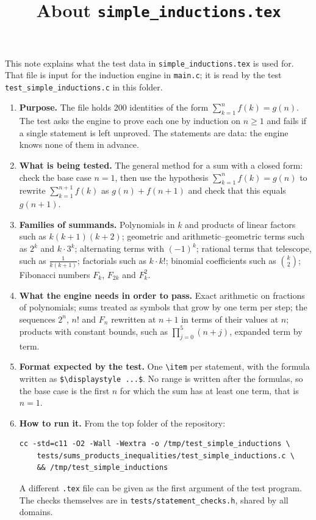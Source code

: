 \documentclass[11pt,a4paper]{article}
\title{About \texttt{simple\_inductions.tex}}
\author{}
\date{}
\begin{document}
\maketitle
This note explains what the test data in \texttt{simple\_inductions.tex} is used for. That file is input for the induction engine in \texttt{main.c}; it is read by the test \texttt{test\_simple\_inductions.c} in this folder.

\begin{enumerate}
\item \textbf{Purpose.} The file holds 200 identities of the form $\displaystyle \sum_{k=1}^{n} f(k) = g(n)$. The test asks the engine to prove each one by induction on $n \ge 1$ and fails if a single statement is left unproved. The statements are data: the engine knows none of them in advance.

\item \textbf{What is being tested.} The general method for a sum with a closed form: check the base case $n = 1$, then use the hypothesis $\sum_{k=1}^{n} f(k) = g(n)$ to rewrite $\sum_{k=1}^{n+1} f(k)$ as $g(n) + f(n+1)$ and check that this equals $g(n+1)$.

\item \textbf{Families of summands.} Polynomials in $k$ and products of linear factors such as $k(k+1)(k+2)$; geometric and arithmetic--geometric terms such as $2^{k}$ and $k \cdot 3^{k}$; alternating terms with $(-1)^{k}$; rational terms that telescope, such as $\frac{1}{k(k+1)}$; factorials such as $k \cdot k!$; binomial coefficients such as $\binom{k}{2}$; Fibonacci numbers $F_{k}$, $F_{2k}$ and $F_{k}^{2}$.

\item \textbf{What the engine needs in order to pass.} Exact arithmetic on fractions of polynomials; sums treated as symbols that grow by one term per step; the sequences $2^{n}$, $n!$ and $F_{n}$ rewritten at $n + 1$ in terms of their values at $n$; products with constant bounds, such as $\prod_{j=0}^{5} (n + j)$, expanded term by term.

\item \textbf{Format expected by the test.} One \texttt{\textbackslash item} per statement, with the formula written as \texttt{\$\textbackslash displaystyle ...\$}. No range is written after the formulas, so the base case is the first $n$ for which the sum has at least one term, that is $n = 1$.

\item \textbf{How to run it.} From the top folder of the repository:
\begin{verbatim}
cc -std=c11 -O2 -Wall -Wextra -o /tmp/test_simple_inductions \
    tests/sums_products_inequalities/test_simple_inductions.c \
    && /tmp/test_simple_inductions
\end{verbatim}
A different \texttt{.tex} file can be given as the first argument of the test program. The checks themselves are in \texttt{tests/statement\_checks.h}, shared by all domains.


\end{enumerate}
\end{document}

